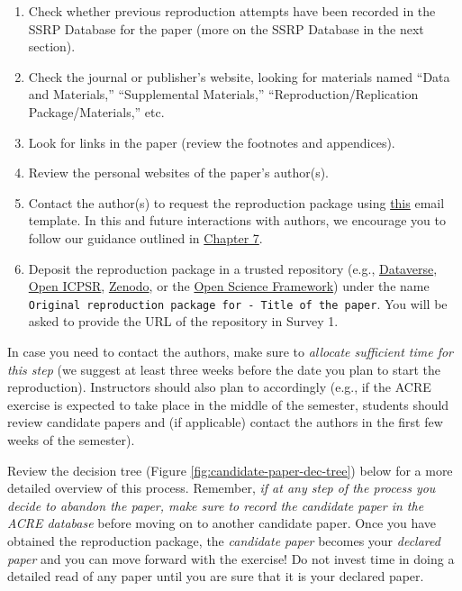 \documentclass[
]{book}
\providecommand{\tightlist}{%
  \setlength{\itemsep}{0pt}\setlength{\parskip}{0pt}}
\begin{document}
\begin{enumerate}
\def\labelenumi{\arabic{enumi}.}
\tightlist
\item
  Check whether previous reproduction attempts have been recorded in the SSRP Database for the paper (more on the SSRP Database in the next section).
\item
  Check the journal or publisher's website, looking for materials named ``Data and Materials,'' ``Supplemental Materials,'' ``Reproduction/Replication Package/Materials,'' etc.\\
\item
  Look for links in the paper (review the footnotes and appendices).\\
\item
  Review the personal websites of the paper's author(s).
\item
  Contact the author(s) to request the reproduction package using \href{https://bitss.github.io/ACRE/guidance-for-a-constructive-exchange-between-reproducers-and-original-authors.html\#contacting-the-original-authors-when-there-is-no-reproduction-package}{this} email template. In this and future interactions with authors, we encourage you to follow our guidance outlined in \href{https://bitss.github.io/ACRE/guidance-for-a-constructive-exchange-between-reproducers-and-original-authors.html\#contacting-the-original-authors-when-there-is-no-reproduction-package}{Chapter 7}.
\item
  Deposit the reproduction package in a trusted repository (e.g., \href{https://dataverse.org/}{Dataverse}, \href{https://www.openicpsr.org/openicpsr/}{Open ICPSR}, \href{https://zenodo.org/}{Zenodo}, or the \href{https://osf.io/}{Open Science Framework}) under the name \texttt{Original\ reproduction\ package\ for\ -\ Title\ of\ the\ paper}. You will be asked to provide the URL of the repository in Survey 1.
\end{enumerate}

In case you need to contact the authors, make sure to \emph{allocate sufficient time for this step} (we suggest at least three weeks before the date you plan to start the reproduction). Instructors should also plan to accordingly (e.g., if the ACRE exercise is expected to take place in the middle of the semester, students should review candidate papers and (if applicable) contact the authors in the first few weeks of the semester).

Review the decision tree (Figure \ref{fig:candidate-paper-dec-tree}) below for a more detailed overview of this process. Remember, \emph{if at any step of the process you decide to abandon the paper, make sure to record the candidate paper in the ACRE database} before moving on to another candidate paper. Once you have obtained the reproduction package, the \emph{candidate paper} becomes your \emph{declared paper} and you can move forward with the exercise! Do not invest time in doing a detailed read of any paper until you are sure that it is your declared paper.
\end{document}
